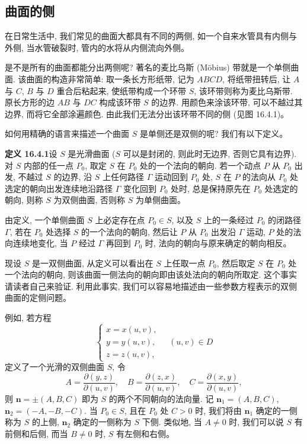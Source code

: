 \documentclass[UTF8, 12pt, fontset=fandol, oneside]{ctexart}
\begin{document}
\subsection{曲面的侧}

在日常生活中, 我们常见的曲面大都具有不同的两侧, 如一个自来水管具有内侧与外侧, 当水管破裂时, 管内的水将从内侧流向外侧。

是不是所有的曲面都能分出两侧呢? 著名的麦比乌斯 (Möbius) 带就是一个单侧曲面. 该曲面的构造非常简单: 取一条长方形纸带, 记为 $ABCD$, 将纸带扭转后, 让 $A$ 与 $C$, $B$ 与 $D$ 重合后粘起来, 使纸带构成一个环带 $S$, 该环带则称为麦比乌斯带. 原长方形的边 $AB$ 与 $DC$ 构成该环带 $S$ 的边界. 用颜色来涂该环带, 可以不越过其边界, 而将它全部涂遍颜色. 由此我们无法分出该环带不同的侧 (见图 16.4.1)。

如何用精确的语言来描述一个曲面 $S$ 是单侧还是双侧的呢? 我们有以下定义。

\noindent\textbf{定义 16.4.1}\quad 设 $S$ 是光滑曲面 ($S$ 可以是封闭的, 则此时无边界, 否则它具有边界). 对 $S$ 内部的任一点 $P_0$, 取定 $S$ 在 $P_0$ 处的一个法向的朝向. 若一个动点 $P$ 从 $P_0$ 出发, 不越过 $S$ 的边界, 沿 $S$ 上任何路径 $\Gamma$ 运动回到 $P_0$ 处, $S$ 在 $P$ 的法向从 $P_0$ 处选定的朝向出发连续地沿路径 $\Gamma$ 变化回到 $P_0$ 处时, 总是保持原先在 $P_0$ 处选定的朝向, 则称 $S$ 为双侧曲面, 否则称 $S$ 为单侧曲面。

由定义, 一个单侧曲面 $S$ 上必定存在点 $P_0\in S$, 以及 $S$ 上的一条经过 $P_0$ 的闭路径 $\Gamma$, 若在 $P_0$ 处选择 $S$ 的一个法向的朝向, 然后让 $P$ 从 $P_0$ 出发沿 $\Gamma$ 运动, $P$ 处的法向连续地变化, 当 $P$ 经过 $\Gamma$ 再回到 $P_0$ 时, 法向的朝向与原来确定的朝向相反。

现设 $S$ 是一双侧曲面, 从定义可以看出在 $S$ 上任取一点 $P_0$, 然后取定 $S$ 在 $P_0$ 处一个法向的朝向, 则该曲面一侧法向的朝向即由该处法向的朝向所取定. 这个事实请读者自己来验证. 利用此事实, 我们可以容易地描述由一些参数方程表示的双侧曲面的定侧问题。

例如, 若方程
\[
  \begin{cases}
    x=x(u,v),\\
    y=y(u,v),\\
    z=z(u,v),
  \end{cases}\quad (u,v)\in D
\]
定义了一个光滑的双侧曲面 $S$, 令
\begin{equation}
  A=\frac{\partial(y,z)}{\partial(u,v)},\quad
  B=\frac{\partial(z,x)}{\partial(u,v)},\quad
  C=\frac{\partial(x,y)}{\partial(u,v)},
  \tag{16.4.1}
\end{equation}
则 $\boldsymbol n=\pm(A,B,C)$ 即为 $S$ 的两个不同朝向的法向量. 记 $\boldsymbol n_1=(A,B,C)$, $\boldsymbol n_2=(-A,-B,-C)$. 当 $P_0\in S$, 且在 $P_0$ 处 $C>0$ 时, 我们将由 $\boldsymbol n_1$ 确定的一侧称为 $S$ 的上侧, $\boldsymbol n_2$ 确定的一侧称为 $S$ 下侧. 类似地, 当 $A\ne0$ 时, 我们可以说 $S$ 有前侧和后侧, 而当 $B\ne0$ 时, $S$ 有左侧和右侧。
\end{document}
